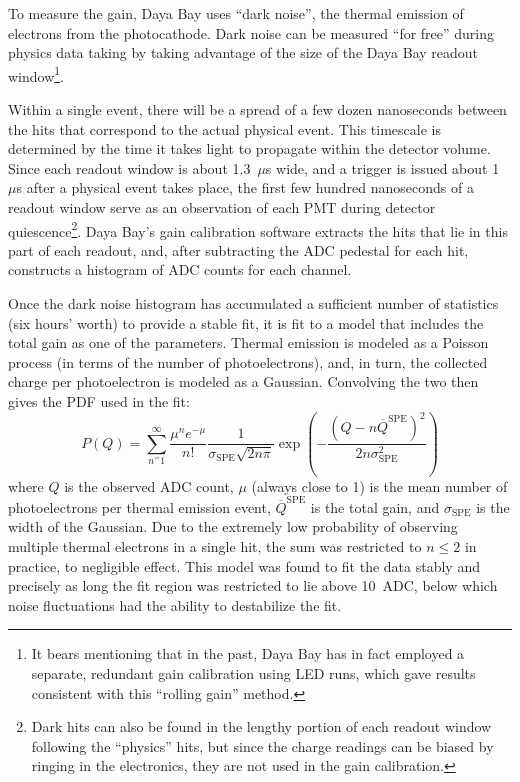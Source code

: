 \documentclass[../thesis.tex]{subfiles}
\begin{document}
To measure the gain, Daya Bay uses ``dark noise'', the thermal emission of electrons from the photocathode. Dark noise can be measured ``for free'' during physics data taking by taking advantage of the size of the Daya Bay readout window\footnote{It bears mentioning that in the past, Daya Bay has in fact employed a separate, redundant gain calibration using LED runs, which gave results consistent with this ``rolling gain'' method.}.
\begin{comment}
  \footnote{(WRONG) Each dynode can of course also emit electrons, but the collected charge is attenuated by $\mathcal{O}(5^n)$ for emission from the $n$th dynode. This effect can therefore be safely neglected for our purposes. NOTE: This can't be the reason. A 1/5-scale effect is certainly relevant if dynode thermal emission happens often enough. I believe the actual reason for only considering photocathode emission is that it's the only material that emits electrons at a significant rate (thanks to its work function?).}
\end{comment}
Within a single event, there will be a spread of a few dozen nanoseconds between the hits that correspond to the actual physical event. This timescale is determined by the time it takes light to propagate within the detector volume. Since each readout window is about 1.3~$\mu$s wide, and a trigger is issued about 1~$\mu$s after a physical event takes place, the first few hundred nanoseconds of a readout window serve as an observation of each PMT during detector quiescence\footnote{Dark hits can also be found in the lengthy portion of each readout window following the ``physics'' hits, but since the charge readings can be biased by ringing in the electronics, they are not used in the gain calibration.}. Daya Bay's gain calibration software extracts the hits that lie in this part of each readout, and, after subtracting the ADC pedestal for each hit, constructs a histogram of ADC counts for each channel.

Once the dark noise histogram has accumulated a sufficient number of statistics (six hours' worth) to provide a stable fit, it is fit to a model that includes the total gain as one of the parameters. Thermal emission is modeled as a Poisson process (in terms of the number of photoelectrons), and, in turn, the collected charge per photoelectron is modeled as a Gaussian. Convolving the two then gives the PDF used in the fit:
\begin{equation*}
  P(Q) = \sum_{n^=1}^{\infty} \frac{\mu^n e^{-\mu}}{n!} \frac{1}{\sigma_{\mathrm{SPE}}\sqrt{2n\pi}} \exp\left(-\frac{(Q - n\overline Q^{\mathrm{SPE}})^2}{2n\sigma_{\mathrm{SPE}}^2}\right)
\end{equation*}
where $Q$ is the observed ADC count, $\mu$ (always close to 1) is the mean number of photoelectrons per thermal emission event, $\overline Q^{\mathrm{SPE}}$ is the total gain, and $\sigma_{\mathrm{SPE}}$ is the width of the Gaussian. Due to the extremely low probability of observing multiple thermal electrons in a single hit, the sum was restricted to $n \le 2$ in practice, to negligible effect. This model was found to fit the data stably and precisely as long the fit region was restricted to lie above 10~ADC, below which noise fluctuations had the ability to destabilize the fit.
\end{document}
